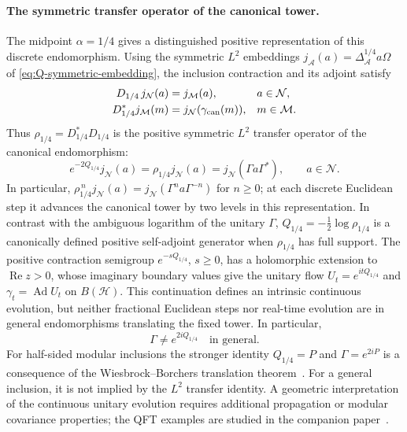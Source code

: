 \documentclass[a4paper,11pt]{article}
\theoremstyle{definition}
\newcommand{\mA}{\mathcal{A}}%
\newcommand{\mN}{\mathcal{N}}
\newcommand{\mH}{\mathcal{H}}
\newcommand{\mM}{\mathcal{M}}
\begin{document}
\paragraph{The symmetric transfer operator of the canonical tower.}
The midpoint $\alpha=1/4$ gives a distinguished positive representation
of this discrete endomorphism. Using the symmetric $L^2$ embeddings
$j_{\mA}(a)=\Delta_{\mA}^{1/4}a\Omega$ of
\eqref{eq:Q-symmetric-embedding}, the inclusion contraction and its
adjoint satisfy
\begin{equation}
 \begin{aligned}
 D_{1/4}\,j_{\mN}(a)&=j_{\mM}(a),&&a\in\mN,\\
 D_{1/4}^*j_{\mM}(m)&=j_{\mN}(\gamma_{\rm can}(m)),&&m\in\mM.
 \end{aligned}
 \label{eq:canonical-L2-adjoint}
\end{equation}
Thus $\rho_{1/4}=D_{1/4}^*D_{1/4}$ is the positive symmetric
$L^2$ transfer operator of the canonical endomorphism:
\begin{equation}
 \boxed{\quad
 e^{-2Q_{1/4}}j_{\mN}(a)
 =\rho_{1/4}j_{\mN}(a)
 =j_{\mN}(\Gamma a\Gamma^*),\qquad a\in\mN.\quad}
 \label{eq:canonical-L2-transfer}
\end{equation}
In particular, $\rho_{1/4}^{\,n}j_{\mN}(a)
=j_{\mN}(\Gamma^n a\Gamma^{-n})$ for $n\geq0$; at each discrete
Euclidean step it advances the canonical tower by two levels in this
representation. In contrast with the ambiguous logarithm of the unitary
$\Gamma$, $Q_{1/4}=-\tfrac12\log\rho_{1/4}$ is a canonically defined
positive self-adjoint generator when $\rho_{1/4}$ has full support.
The positive contraction semigroup $e^{-sQ_{1/4}}$, $s\geq0$,
has a holomorphic extension to $\operatorname{Re}z>0$, whose imaginary
boundary values give the unitary flow $U_t=e^{itQ_{1/4}}$ and
$\gamma_t=\operatorname{Ad}U_t$ on $B(\mH)$.
This continuation defines an intrinsic continuous evolution, but
neither fractional Euclidean steps nor real-time evolution are
in general endomorphisms translating the fixed tower. In particular,
\begin{equation}
 \Gamma\ne e^{2iQ_{1/4}}
 \quad\text{in general}.
 \label{eq:canonical-not-unitary-interpolation}
\end{equation}
For half-sided modular inclusions the stronger identity $Q_{1/4}=P$ and $\Gamma=e^{2iP}$ is a consequence of the Wiesbrock--Borchers translation theorem~\cite{Wiesbrock1993,Borchers1992,companionQFT}. For a general inclusion, it is not implied by the $L^2$ transfer identity. A geometric interpretation of the continuous unitary evolution requires additional propagation or modular covariance properties; the QFT examples are studied in the companion paper~\cite{companionQFT}.
\end{document}
